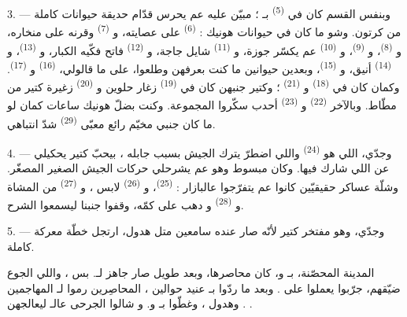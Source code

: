 3. --- وبنفس القسم كان في  \textsuperscript{(5)}
بـ ؛ مبيّن عليه عم يحرس قدّام حديقة حيوانات كاملة
من كرتون. وشو ما كان في حيوانات هونيك : 
\textsuperscript{(6)} على عصايته، و \textsuperscript{(7)}
وقرنه على منخاره، و \textsuperscript{(8)}، و
\textsuperscript{(9)}، و \textsuperscript{(10)} عم يكسّر جوزة،
و \textsuperscript{(11)} شايل جاجة، و
\textsuperscript{(12)} فاتح فكّيه الكبار، و
\textsuperscript{(13)}، و \textsuperscript{(14)} أنيق،
و \textsuperscript{(15)}، وبعدين حيوانين ما كنت بعرفهن وطلعوا،
على ما قالولي،  \textsuperscript{(16)} و
\textsuperscript{(17)}. وكمان كان في  \textsuperscript{(18)}
و \textsuperscript{(21)} ؛ وكتير جنبهن كان في 
\textsuperscript{(19)} زغار حلوين و \textsuperscript{(20)}
زغيرة كتير من مطّاط. وبالآخر  \textsuperscript{(22)}
و \textsuperscript{(23)} أحدب سكّروا المجموعة.
وكنت بضلّ هونيك ساعات كمان لو ما كان جنبي مخيّم رائع معبّى
 \textsuperscript{(29)} شدّ انتباهي.

\VUsaut{4.0mm}
\VUsaut{2.8mm}

4. --- وجدّي، اللي هو  \textsuperscript{(24)} واللي
اضطرّ يترك الجيش بسبب  جابله ، بيحبّ كتير يحكيلي عن  اللي شارك فيها. وكان
مبسوط وهو عم يشرحلي حركات الجيش الصغير المصغّر. وشلّة عساكر حقيقيّين
كانوا عم يتفرّجوا عالبازار :  \textsuperscript{(25)}،
و \textsuperscript{(26)} لابس ،
و \textsuperscript{(27)} من المشاة و \textsuperscript{(28)} و دهب على كمّه، وقفوا جنبنا
ليسمعوا الشرح.

5. --- وجدّي، وهو مفتخر كتير لأنّه صار عنده سامعين متل هدول، ارتجل
خطّة معركة كاملة.

المدينة المحصّنة، بـ و، كان
 محاصرها، وبعد  طويل صار جاهز
لـ. بس ، واللي الجوع ضيّقهم، جرّبوا
يعملوا  على  .
وبعد ما ردّوا  بـ عنيد حوالين
، المحاصِرين  رموا 
لـ المهاجمين . وهدول
، وغطّوا  بـ
و. و شالوا الجرحى
عالـ ليعالجهن .


